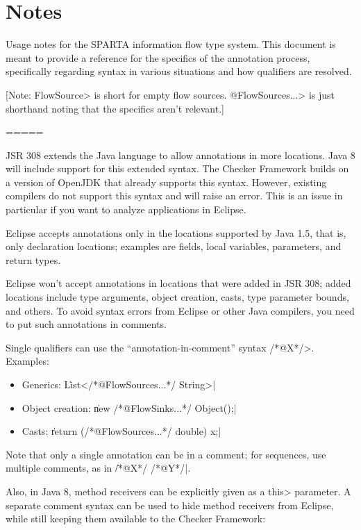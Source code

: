 \htmlhr
\chapter{Notes\label{notes}}

Usage notes for the SPARTA information flow type system. This document
is meant to provide a reference for the specifics of the annotation
process, specifically regarding syntax in various situations and how
qualifiers are resolved.

[Note: \<FlowSource{}> is short for empty flow sources. \<@FlowSources...> is
just shorthand noting that the specifics aren't relevant.]

=====

JSR 308 extends the Java language to allow annotations in more
locations. Java 8 will include support for this extended syntax.
The Checker Framework builds on a version of OpenJDK that already
supports this syntax.
However, existing compilers do not support this syntax and will raise
an error. This is an issue in particular if you want to analyze
applications in Eclipse.

Eclipse accepts annotations only in the locations supported by Java
1.5, that is, only declaration locations; examples are fields, local
variables, parameters, and return types.

Eclipse won't accept annotations in locations that were added in
JSR 308; added locations include type arguments, object creation,
casts, type parameter bounds, and others.
To avoid syntax errors from Eclipse or other Java compilers, you need
to put such annotations in comments.

Single qualifiers can use the ``annotation-in-comment'' syntax
\</*@X*/>. Examples:

\begin{itemize}
\item Generics:
	\|List</*@FlowSources...*/ String>|

\item Object creation:
	\|new /*@FlowSinks...*/ Object();|

\item Casts:
	\|return (/*@FlowSources...*/ double) x;|
\end{itemize}

Note that only a single annotation can be in a comment; for
sequences, use multiple comments, as in \|/*@X*/ /*@Y*/|.

Also, in Java 8, method receivers can be explicitly given as a \<this>
parameter.
A separate comment syntax can be used to hide method receivers from
Eclipse, while still keeping them available to the Checker Framework:

